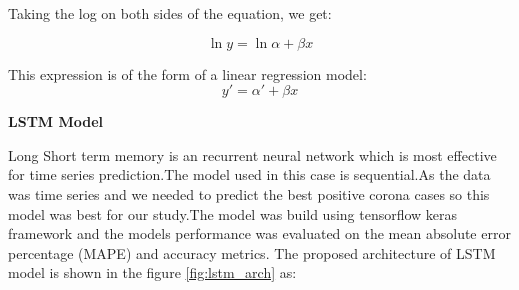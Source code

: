 Taking the log on both sides of the equation, we get:

\begin{equation}
	\ln y = \ln \alpha + \beta x
\end{equation}

This expression is of the form of a linear regression model:
\begin{equation}
	y\prime = \alpha \prime + \beta x
\end{equation}


\pagebreak

\textbf{LSTM Model}

Long Short term memory is an recurrent neural network which is most effective for time
series prediction.The model used in this case is sequential.As the data was time series and
we needed to predict the best positive corona cases so this model was best for our study.The
model was build using tensorflow keras framework and the models performance was
evaluated on the mean absolute error percentage (MAPE) and accuracy metrics.
The proposed architecture of LSTM model is shown in the figure
\ref{fig:lstm_arch} as:

